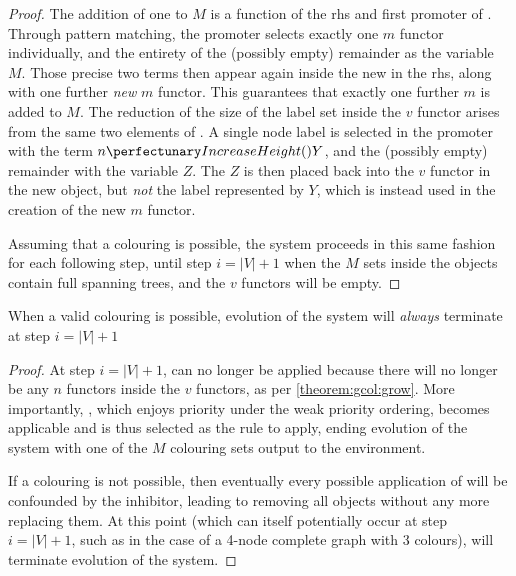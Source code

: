 \begin{proof}
The addition of one to \(M\) is a function of the \gls{rhs} and first \gls{promoter} of .  Through pattern matching, the \gls{promoter} selects exactly one \(m\) functor individually, and the entirety of the (possibly empty) remainder as the variable \(M\).  Those precise two terms then appear again inside the new \bo{} in the \gls{rhs}, along with one further \emph{new} \(m\) functor.  This guarantees that exactly one further \(m\) is added to \(M\).  The reduction of the size of the label set inside the \(v\) functor arises from the same two elements of .  A single node label is selected in the \gls{promoter} with the term \(\cpfunc{n}{Y}\), and the (possibly empty) remainder with the variable \(Z\).  The \(Z\) is then placed back into the \(v\) functor in the new \bo{} object, but \emph{not} the label represented by \(Y\), which is instead used in the creation of the new \(m\) functor.


Assuming that a colouring is possible, the system proceeds in this same fashion for each following step, until step \(i = |V| + 1\) when the \(M\) sets inside the \bo{} objects contain full spanning trees, and the \(v\) \glspl{functor} will be empty.
\end{proof}

\begin{lemma}
When a valid colouring is possible, evolution of the system will \emph{always} terminate at step \(i = |V| + 1\)
\end{lemma}

\begin{proof}
At step \(i = |V| + 1\),  can no longer be applied because there will no longer be any \(n\) \glspl{functor} inside the \(v\) \glspl{functor}, as per \cref{theorem:gcol:grow}.  More importantly, , which enjoys priority under the weak priority ordering, becomes applicable and is thus selected as the rule to apply, ending evolution of the system with one of the \(M\) colouring sets output to the environment.

If a colouring is not possible, then eventually every possible application of  will be confounded by the \gls{inhibitor}, leading to  removing all \bo{} objects without any more replacing them.  At this point (which can itself potentially occur at step \(i = |V| + 1\), such as in the case of a 4-node complete graph with 3 colours),  will terminate evolution of the system.
\end{proof}

